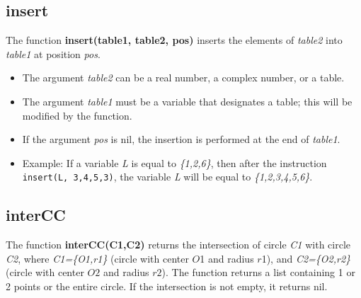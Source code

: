 \subsection{insert}
The function \textbf{insert(table1, table2, pos)} inserts the elements of \emph{table2} into \emph{table1} at position \emph{pos}.

\begin{itemize}
    \item The argument \emph{table2} can be a real number, a complex number, or a table.
    \item The argument \emph{table1} must be a variable that designates a table; this will be modified by the function.
    \item If the argument \emph{pos} is nil, the insertion is performed at the end of \emph{table1}.
    \item Example: If a variable \emph{L} is equal to \emph{\{1,2,6\}}, then after the instruction \texttt{insert(L, {3,4,5},3)}, the variable \emph{L} will be equal to \emph{\{1,2,3,4,5,6\}}.
\end{itemize}

\subsection{interCC}
The function \textbf{interCC(C1,C2)} returns the intersection of circle \emph{C1} with circle \emph{C2}, where \emph{C1=\{O1,r1\}} (circle with center $O$1 and radius $r$1), and \emph{C2=\{O2,r2\}} (circle with center $O2$ and radius $r2$). The function returns a list containing 1 or 2 points or the entire circle. If the intersection is not empty, it returns nil.


